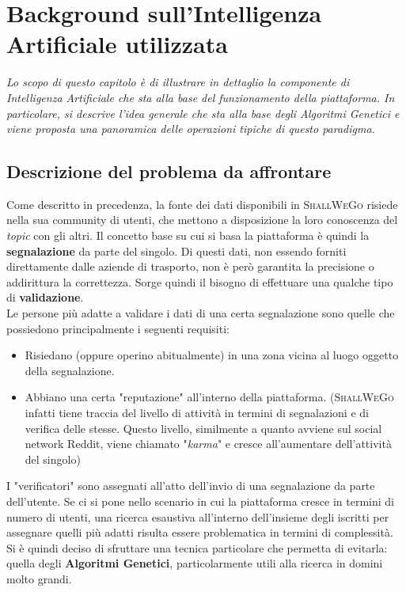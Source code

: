 \chapter{Background sull'Intelligenza Artificiale utilizzata} %
%

\begin{citazione}
    \textit{Lo scopo di questo capitolo è di illustrare in dettaglio la componente di Intelligenza Artificiale che sta alla base del funzionamento della piattaforma. In particolare, si descrive l'idea generale che sta alla base degli Algoritmi Genetici e viene proposta una panoramica delle operazioni tipiche di questo paradigma.}
\end{citazione}

\newpage

\section{Descrizione del problema da affrontare}
    Come descritto in precedenza, la fonte dei dati disponibili in \textsc{ShallWeGo} risiede nella sua community di utenti, che mettono a disposizione la loro conoscenza del \textit{topic} con gli altri. Il concetto base su cui si basa la piattaforma è quindi la \textbf{segnalazione} da parte del singolo. Di questi dati, non essendo forniti direttamente dalle aziende di trasporto, non è però garantita la precisione o addirittura la correttezza. Sorge quindi il bisogno di effettuare una qualche tipo di \textbf{validazione}. \\
    Le persone più adatte a validare i dati di una certa segnalazione sono quelle che possiedono principalmente i seguenti requisiti:
    \begin{itemize}
        \item Risiedano (oppure operino abitualmente) in una zona vicina al luogo oggetto della segnalazione.
        \item Abbiano una certa "reputazione" all'interno della piattaforma. (\textsc{ShallWeGo} infatti tiene traccia del livello di attività in termini di segnalazioni e di verifica delle stesse. Questo livello, similmente a quanto avviene sul social network Reddit, viene chiamato "\textit{karma}" e cresce all'aumentare dell'attività del singolo)
    \end{itemize}

    I "verificatori" sono assegnati all'atto dell'invio di una segnalazione da parte dell'utente. 
    Se ci si pone nello scenario in cui la piattaforma cresce in termini di numero di utenti, una ricerca esaustiva all'interno dell'insieme degli iscritti per assegnare quelli più adatti risulta essere problematica in termini di complessità. Si è quindi deciso di sfruttare una tecnica particolare che permetta di evitarla: quella degli \textbf{Algoritmi Genetici}, particolarmente utili alla ricerca in domini molto grandi.

